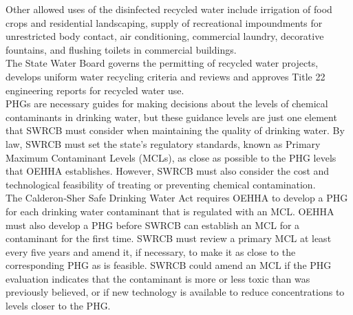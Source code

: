 Other allowed uses of the disinfected recycled water include irrigation of food crops and residential landscaping, supply of recreational impoundments for unrestricted body contact, air conditioning, commercial laundry, decorative fountains, and flushing toilets in commercial buildings.\\

The State Water Board governs the permitting of recycled water projects, develops uniform water recycling criteria and reviews and approves Title 22 engineering reports for recycled water use.\\



PHGs are necessary guides for making decisions about the levels of chemical contaminants in drinking water, but these guidance levels are just one element that SWRCB must consider when maintaining the quality of drinking water.   By law, SWRCB must set the state’s regulatory standards, known as Primary Maximum Contaminant Levels (MCLs), as close as possible to the PHG levels that OEHHA establishes. However, SWRCB must also consider the cost and technological feasibility of treating or preventing chemical contamination. \\

The Calderon‐Sher Safe Drinking Water Act requires OEHHA to develop a PHG for each drinking water contaminant that is regulated with an MCL. OEHHA must also develop a PHG before SWRCB can establish an MCL for a contaminant for the first time. SWRCB must review a primary MCL at least every five years and amend it, if necessary, to make it as close to the corresponding PHG as is feasible. SWRCB could amend an MCL if the PHG evaluation indicates that the contaminant is more or less toxic than was previously believed, or if new technology is available to reduce concentrations to levels closer to the PHG. \\

